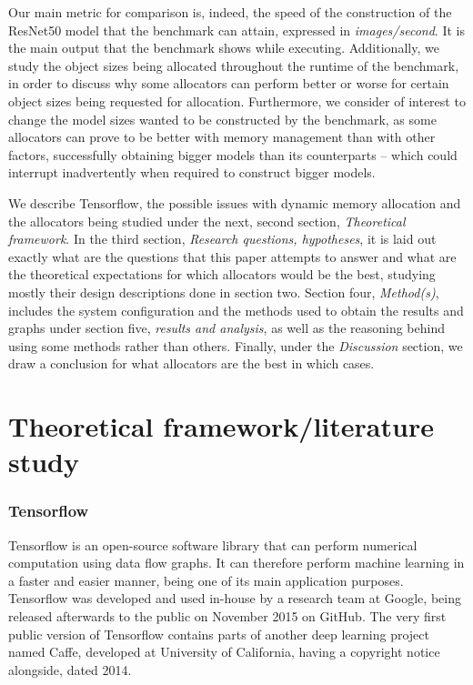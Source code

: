 \documentclass[12pt,twoside]{article}
\begin{document}
Our main metric for comparison is, indeed, the speed of the construction of the ResNet50 model that the benchmark can attain, expressed in \textit{images/second}. It is the main output that the benchmark shows while executing. Additionally, we study the object sizes being allocated throughout the runtime of the benchmark, in order to discuss why some allocators can perform better or worse for certain object sizes being requested for allocation. Furthermore, we consider of interest to change the model sizes wanted to be constructed by the benchmark, as some allocators can prove to be better with memory management than with other factors, successfully obtaining bigger models than its counterparts -- which could interrupt inadvertently when required to construct bigger models.

We describe Tensorflow, the possible issues with dynamic memory allocation and the allocators being studied under the next, second section, \textit{Theoretical framework}. In the third section, \textit{Research questions, hypotheses}, it is laid out exactly what are the questions that this paper attempts to answer and what are the theoretical expectations for which allocators would be the best, studying mostly their design descriptions done in section two. Section four, \textit{Method(s)}, includes the system configuration and the methods used to obtain the results and graphs under section five, \textit{results and analysis}, as well as the reasoning behind using some methods rather than others. Finally, under the \textit{Discussion} section, we draw a conclusion for what allocators are the best in which cases.




\section{Theoretical framework/literature study}
\label{sec:theoretical-framework}

\subsubsection*{Tensorflow}

Tensorflow is an open-source software library that can perform numerical computation using data flow graphs. It can therefore perform machine learning in a faster and easier manner, being one of its main application purposes. Tensorflow was developed and used in-house by a research team at Google, being released afterwards to the public on November 2015 on GitHub. The very first public version of Tensorflow contains parts of another deep learning project named Caffe, developed at University of California, having a copyright notice alongside, dated 2014.
\end{document}
